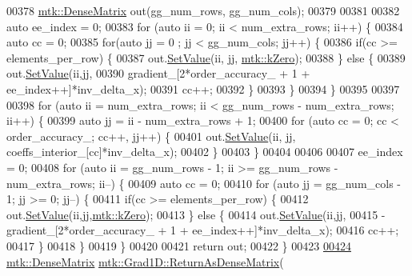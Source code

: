 \begin{DoxyCode}
{{00378   \hyperlink{classmtk_1_1DenseMatrix}{mtk::DenseMatrix} out(gg\_num\_rows, gg\_num\_cols);
00379 
00381 
00382   \textcolor{keyword}{auto} ee\_index = 0;
00383   \textcolor{keywordflow}{for} (\textcolor{keyword}{auto} ii = 0; ii < num\_extra\_rows; ii++) \{
00384     \textcolor{keyword}{auto} cc = 0;
00385     \textcolor{keywordflow}{for}(\textcolor{keyword}{auto} jj = 0 ; jj < gg\_num\_cols; jj++) \{
00386       \textcolor{keywordflow}{if}(cc >= elements\_per\_row) \{
00387         out.\hyperlink{classmtk_1_1DenseMatrix_a784ce5784109ac86bfb9d8562b334b13}{SetValue}(ii, jj, \hyperlink{group__c01-roots_ga59a451a5fae30d59649bcda274fea271}{mtk::kZero});
00388       \} \textcolor{keywordflow}{else} \{
00389         out.\hyperlink{classmtk_1_1DenseMatrix_a784ce5784109ac86bfb9d8562b334b13}{SetValue}(ii,jj,
00390                      gradient\_[2*order\_accuracy\_ + 1 + ee\_index++]*inv\_delta\_x);
00391         cc++;
00392       \}
00393     \}
00394   \}
00395 
00397 
00398   \textcolor{keywordflow}{for} (\textcolor{keyword}{auto} ii = num\_extra\_rows; ii < gg\_num\_rows - num\_extra\_rows; ii++) \{
00399     \textcolor{keyword}{auto} jj = ii - num\_extra\_rows + 1;
00400     \textcolor{keywordflow}{for} (\textcolor{keyword}{auto} cc = 0; cc < order\_accuracy\_; cc++, jj++) \{
00401       out.\hyperlink{classmtk_1_1DenseMatrix_a784ce5784109ac86bfb9d8562b334b13}{SetValue}(ii, jj, coeffs\_interior\_[cc]*inv\_delta\_x);
00402     \}
00403   \}
00404 
00406 
00407   ee\_index = 0;
00408   \textcolor{keywordflow}{for} (\textcolor{keyword}{auto} ii = gg\_num\_rows - 1; ii >= gg\_num\_rows - num\_extra\_rows; ii--) \{
00409     \textcolor{keyword}{auto} cc = 0;
00410     \textcolor{keywordflow}{for} (\textcolor{keyword}{auto} jj = gg\_num\_cols - 1; jj >= 0; jj--) \{
00411       \textcolor{keywordflow}{if}(cc >= elements\_per\_row) \{
00412         out.\hyperlink{classmtk_1_1DenseMatrix_a784ce5784109ac86bfb9d8562b334b13}{SetValue}(ii,jj,\hyperlink{group__c01-roots_ga59a451a5fae30d59649bcda274fea271}{mtk::kZero});
00413       \} \textcolor{keywordflow}{else} \{
00414         out.\hyperlink{classmtk_1_1DenseMatrix_a784ce5784109ac86bfb9d8562b334b13}{SetValue}(ii,jj,
00415                      -gradient\_[2*order\_accuracy\_ + 1 + ee\_index++]*inv\_delta\_x);
00416         cc++;
00417       \}
00418      \}
00419   \}
00420 
00421   \textcolor{keywordflow}{return} out;
00422 \}
00423 
\hypertarget{mtk__grad__1d_8cc_source_l00424}{}\hyperlink{classmtk_1_1Grad1D_a871a3b31e257b04d5e303b3211df3a73}{00424} \hyperlink{classmtk_1_1DenseMatrix}{mtk::DenseMatrix} \hyperlink{classmtk_1_1Grad1D_a77b2eddbe4ab03f469306c604d505b1a}{mtk::Grad1D::ReturnAsDenseMatrix}(
}}
\end{DoxyCode}
